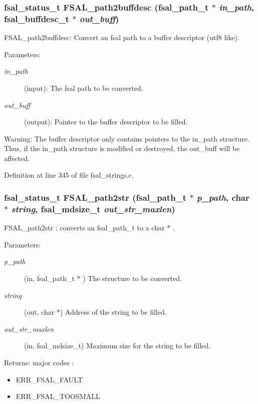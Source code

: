 \subsubsection{\setlength{\rightskip}{0pt plus 5cm}fsal\_\-status\_\-t FSAL\_\-path2buffdesc (fsal\_\-path\_\-t $\ast$ {\em in\_\-path}, fsal\_\-buffdesc\_\-t $\ast$ {\em out\_\-buff})}\label{group__FSALNameFunctions_ga10}


FSAL\_\-path2buffdesc: Convert an fsal path to a buffer descriptor (utf8 like).

\begin{Desc}
\item[Parameters:]
\begin{description}
\item[{\em in\_\-path}](input): The fsal path to be converted. \item[{\em out\_\-buff}](output): Pointer to the buffer descriptor to be filled.\end{description}
\end{Desc}
\begin{Desc}
\item[Warning:]The buffer descriptor only contains pointers to the in\_\-path structure. Thus, if the in\_\-path structure is modified or destroyed, the out\_\-buff will be affected. \end{Desc}


Definition at line 345 of file fsal\_\-strings.c.
\subsubsection{\setlength{\rightskip}{0pt plus 5cm}fsal\_\-status\_\-t FSAL\_\-path2str (fsal\_\-path\_\-t $\ast$ {\em p\_\-path}, char $\ast$ {\em string}, fsal\_\-mdsize\_\-t {\em out\_\-str\_\-maxlen})}\label{group__FSALNameFunctions_ga3}


FSAL\_\-path2str : converts an fsal\_\-path\_\-t to a char $\ast$ .

\begin{Desc}
\item[Parameters:]
\begin{description}
\item[{\em p\_\-path}](in, fsal\_\-path\_\-t $\ast$ ) The structure to be converted. \item[{\em string}](out, char $\ast$) Address of the string to be filled. \item[{\em out\_\-str\_\-maxlen}](in, fsal\_\-mdsize\_\-t) Maximum size for the string to be filled.\end{description}
\end{Desc}
\begin{Desc}
\item[Returns:]major codes :\begin{itemize}
\item ERR\_\-FSAL\_\-FAULT\item ERR\_\-FSAL\_\-TOOSMALL \end{itemize}
\end{Desc}


